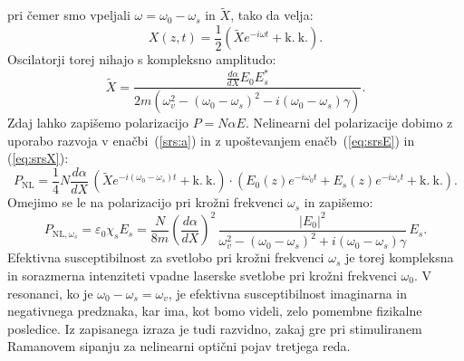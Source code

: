 pri čemer smo vpeljali $\omega = \omega_0-\omega_s$ in $\tilde{X}$, tako da velja:
\begin{equation}
X(z,t) = \frac{1}{2}\left(\tilde{X}e^{-i\omega t}+ \mathrm{k.~k.}\right)\!\!.
\label{eq:srsX}
\end{equation}
Oscilatorji torej nihajo s kompleksno amplitudo:
\begin{equation}
\tilde{X} = \frac{\frac{d\alpha}{dX}E_0 E_s^*}{2m\left(
\omega_v^2-(\omega_0-\omega_s)^2-i(\omega_0-\omega_s)\gamma\right)}.
\end{equation}
Zdaj lahko zapišemo polarizacijo $P = N\alpha E$. Nelinearni del
polarizacije dobimo z uporabo razvoja v enačbi~(\ref{srs:a}) 
in z upoštevanjem enačb~(\ref{eq:srsE}) in (\ref{eq:srsX}):
\begin{equation}
P_{\mathrm{NL}} = \frac{1}{4} N \frac{d\alpha}{dX} \, \left(\tilde{X}
e^{-i(\omega_0-\omega_s)t}
+ \mathrm{k.~k.}\right) \cdot \left( E_0(z)e^{-i\omega_0t}+ E_s(z)e^{-i\omega_st} + \mathrm{k.~k.}\right)\!\!.
\end{equation}
Omejimo se le na polarizacijo pri krožni frekvenci $\omega_s$ in zapišemo:
\begin{equation}
P_{\mathrm{NL},\omega_s} = \varepsilon_0 \chi_s E_s = 
\frac{N }{8m}\left(\frac{d\alpha}{dX}\right)^2 \, 
\frac{|E_0|^2}{\omega_v^2-(\omega_0-\omega_s)^2+i(\omega_0-\omega_s)\gamma}\,E_s.
\label{srs:chi}
\end{equation}
Efektivna susceptibilnost za svetlobo pri krožni frekvenci $\omega_s$ 
je  torej kompleksna in sorazmerna intenziteti 
vpadne laserske svetlobe pri krožni frekvenci $\omega_0$. 
V resonanci, ko je $\omega_0-\omega_s = \omega_v$, je efektivna susceptibilnost
imaginarna in negativnega predznaka, kar ima, kot bomo videli, zelo pomembne 
fizikalne posledice. Iz zapisanega izraza je tudi razvidno, zakaj gre pri 
stimuliranem Ramanovem sipanju za nelinearni optični pojav tretjega reda. 

